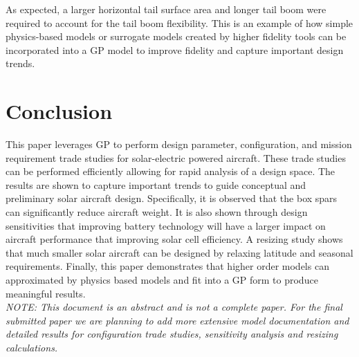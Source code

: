\documentclass[]{aiaa-tc}%
\begin{document}
As expected, a larger horizontal tail surface area and longer tail boom were required to account for the tail boom flexibility.  
This is an example of how simple physics-based models or surrogate models created by higher fidelity tools can be incorporated into a GP model to improve fidelity and capture important design trends.  

\section{Conclusion}

This paper leverages GP to perform design parameter, configuration, and mission requirement trade studies for solar-electric powered aircraft.  
These trade studies can be performed efficiently allowing for rapid analysis of a design space.  
The results are shown to capture important trends to guide conceptual and preliminary solar aircraft design. 
Specifically, it is observed that the box spars can significantly reduce aircraft weight.  
It is also shown through design sensitivities that improving battery technology will have a larger impact on aircraft performance that improving solar cell efficiency. 
A resizing study shows that much smaller solar aircraft can be designed by relaxing latitude and seasonal requirements. 
Finally, this paper demonstrates that higher order models can approximated by physics based models and fit into a GP form to produce meaningful results. \\


\emph{NOTE: This document is an abstract and is not a complete paper.  
For the final submitted paper we are planning to add more extensive model documentation and detailed results for configuration trade studies, sensitivity analysis and resizing calculations.}



\end{document}
